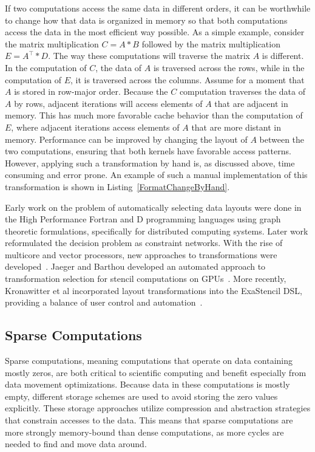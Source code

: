 If two computations access the same data in different orders, it can be worthwhile to change how that data is organized in memory so that both computations access the data in the most efficient way possible.
As a simple example, consider the matrix multiplication $C = A * B$ followed by the matrix multiplication $E = A^{\top} * D$. 
The way these computations will traverse the matrix $A$ is different. 
In the computation of $C$, the data of $A$ is traversed across the rows, while in the computation of $E$, it is traversed across the columns.
Assume for a moment that $A$ is stored in row-major order.
Because the $C$ computation traverses the data of $A$ by rows, adjacent iterations will access elements of $A$ that are adjacent in memory.
This has much more favorable cache behavior than the computation of $E$, where adjacent iterations access elements of $A$ that are more distant in memory.
Performance can be improved by changing the layout of $A$ between the two computations, ensuring that both kernels have favorable access patterns.
However, applying such a transformation by hand is, as discussed above, time consuming and error prone. 
An example of such a manual implementation of this transformation is shown in Listing~\ref{FormatChangeByHand}.

Early work on the problem of automatically selecting data layouts were done in the High Performance Fortran and D programming languages using graph theoretic formulations, specifically for distributed computing systems\cite{kennedy1995automatic,kennedy1998automatic}.
Later work reformulated the decision problem as constraint networks\cite{chen2005constraint}.
With the rise of multicore and vector processors, new approaches to transformations were developed~\cite{lu2009data,henretty2011data,zhang2011optimizing}.
Jaeger and Barthou developed an automated approach to transformation selection for stencil computations on GPUs~\cite{jaeger2012automatic}.
More recently, Kronawitter et al incorporated layout transformations into the ExaStencil DSL, providing a balance of user control and automation~\cite{kronawitter2018automatic}.

\subsection{Sparse Computations}

Sparse computations, meaning computations that operate on data containing mostly zeros, are both critical to scientific computing and benefit especially from data movement optimizations.
Because data in these computations is mostly empty, different storage schemes are used to avoid storing the zero values explicitly. 
These storage approaches utilize compression and abstraction strategies that constrain accesses to the data.
This means that sparse computations are more strongly memory-bound than dense computations, as more cycles are needed to find and move data around.

